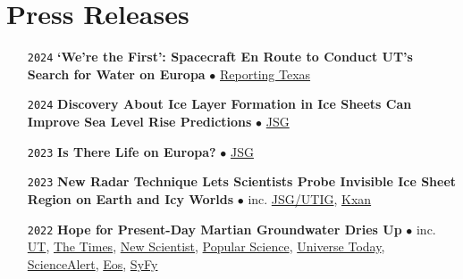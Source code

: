\section*{Press Releases}

\begin{itemize}[leftmargin=3.8em, labelsep=1.5em]
    \setlength\itemsep{-.5em}

    \item[\texttt{2024}] \textbf{‘We’re the First’: Spacecraft En Route to Conduct UT’s Search for Water on Europa} $\bullet$ \href{https://www.reportingtexas.com/were-the-first-spacecraft-en-route-to-conduct-uts-search-for-water-on-europa/}{Reporting Texas}

    \item[\texttt{2024}] \textbf{Discovery About Ice Layer Formation in Ice Sheets Can Improve Sea Level Rise Predictions} $\bullet$ \href{https://www.jsg.utexas.edu/news/2024/09/new-discovery-about-ice-layer-formation-in-ice-sheets-can-improve-sea-level-rise-predictions/}{JSG}

    \item[\texttt{2023}] \textbf{Is There Life on Europa?} $\bullet$ \href{https://www.jsg.utexas.edu/news/2023/12/is-there-life-on-europa/}{JSG}
    
    \item[\texttt{2023}] \textbf{New Radar Technique Lets Scientists Probe Invisible Ice Sheet Region on Earth and Icy Worlds} $\bullet$ inc. \href{https://ig.utexas.edu/news/2023/new-radar-technique-lets-scientists-probe-invisible-ice-sheet-region-on-earth-and-icy-worlds/}{JSG/UTIG}, \href{https://www.kxan.com/news/science/texas-students-work-travels-to-jupiter-helps-track-climate-change-on-earth/}{Kxan}
    
    \item[\texttt{2022}] \textbf{Hope for Present-Day Martian Groundwater Dries Up} $\bullet$ inc. \href{https://news.utexas.edu/2022/01/24/hope-for-present-day-martian-groundwater-dries-up/}{UT}, \href{https://www.thetimes.co.uk/article/hope-dries-up-of-water-on-mars-qngbmwdgp}{The Times}, \href{https://www.newscientist.com/article/2305601-mars-lake-may-actually-be-volcanic-rocks-buried-beneath-the-ice-cap/}{New Scientist}, \href{https://www.popsci.com/science/liquid-water-on-mars-debate/}{Popular Science}, \href{https://www.universetoday.com/154242/is-the-underground-lake-on-mars-just-volcanic-rock/#more-154242}{Universe Today}, \href{https://www.sciencealert.com/liquid-water-detected-under-mars-polar-ice-cap-was-probably-just-rock-new-study-reveals}{ScienceAlert}, \href{https://eos.org/articles/the-bumpy-search-for-liquid-water-at-the-south-pole-of-mars}{Eos}, \href{https://www.syfy.com/syfy-wire/bad-astronomy-liquid-water-under-martian-ice-cap-debate}{SyFy}
    

\end{itemize}
